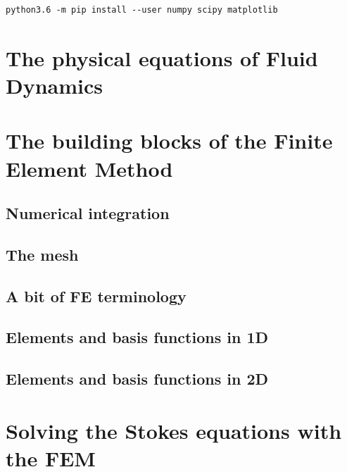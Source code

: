 \documentclass[a4paper]{article}
\begin{document}
\begin{verbatim}
python3.6 -m pip install --user numpy scipy matplotlib
\end{verbatim}

\newpage
\section{The physical equations of Fluid Dynamics} %


\newpage
\section{The building blocks of the Finite Element Method} %

\subsection{Numerical integration}  %

\subsection{The mesh}

\subsection{A bit of FE terminology}  %

\subsection{Elements and basis functions in 1D}  %

\subsection{Elements and basis functions in 2D}  %

\newpage 
\section{Solving the Stokes equations with the FEM} %
\end{document}
